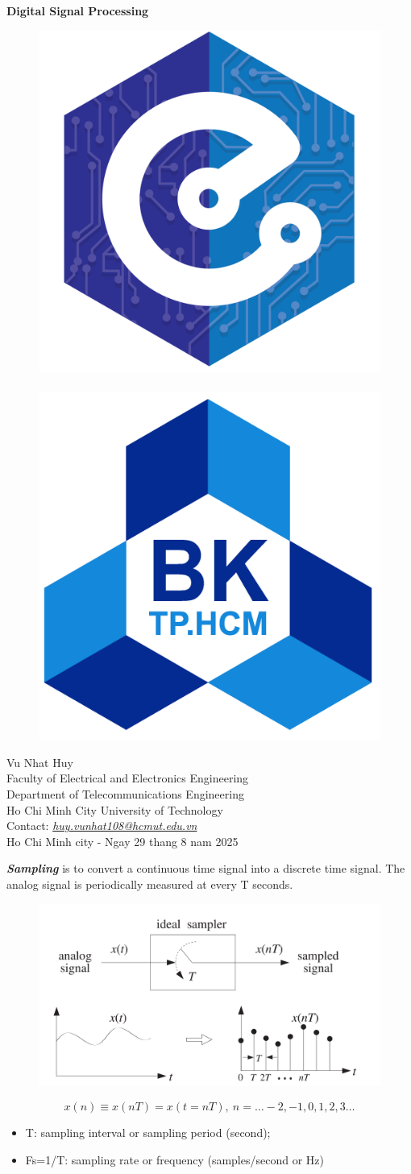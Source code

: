 \documentclass[11pt, a4paper]{article}
\begin{document}
\begin{titlepage}
    \centering
    \vspace*{1in}

    {\LARGE \bfseries Digital Signal Processing}\\[1.5cm]
    \begin{figure}[h!]
        \centering
        \includegraphics[width=0.2\linewidth]{EE.png} $\quad$
        \includegraphics[width=0.2\linewidth]{HCMUT.png}
    \end{figure}
    {\large Vu Nhat Huy}\\[0.5cm]
    {\large Faculty of Electrical and Electronics Engineering}\\
    {\large Department of Telecommunications Engineering}\\
    {\large Ho Chi Minh City University of Technology}\\
    {\large Contact: \href{mailto:huy.vunhat108@hcmut.edu.vn}{\it huy.vunhat108@hcmut.edu.vn}}\\[2cm]

    \vfill
    {\large Ho Chi Minh city - Ngay 29 thang 8 nam 2025}
\end{titlepage}
{
  \tableofcontents
  \thispagestyle{empty}
}
\newpage
\setcounter{page}{1}
\textit{\textbf{Sampling}} is to convert a continuous time signal into a discrete time signal. The analog signal is periodically measured at every T seconds.
\begin{figure}[h!]
    \centering
    \includegraphics[width=0.5\linewidth]{img/3.png}
\end{figure}
\begin{equation*}
    x(n) \equiv x(nT)=x(t=nT),\ n=…-2, -1, 0, 1, 2, 3…
\end{equation*}
\begin{itemize}
    \item T: sampling interval or sampling period (second);
    \item Fs=1/T: sampling rate or frequency (samples/second or Hz)
\end{itemize}
\end{document}
